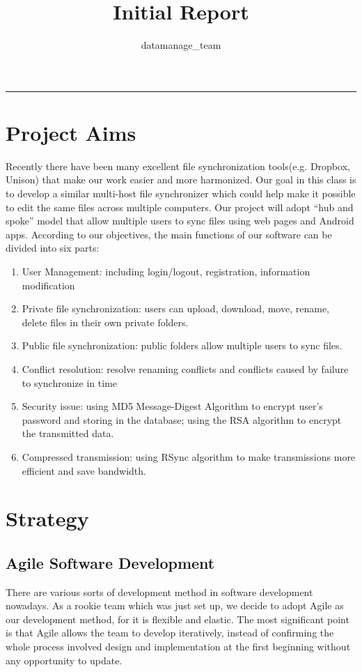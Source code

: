 \documentclass[a4paper,11pt]{article}
\title{Initial Report}
\author{datamanage\_team}
\begin{document}
\maketitle
\begin{center}
\rule{\textwidth}{1pt}
\end{center}

\noindent 
\section{Project Aims}
Recently there have been many excellent file synchronization tools(e.g. Dropbox, Unison) that make our work easier and more harmonized. Our goal in this class is to develop a similar multi-host file synchronizer which could help make it possible to edit the same files across multiple computers. Our project will adopt “hub and spoke” model that allow multiple users to sync files using web pages and Android apps. According to our objectives, the main functions of our software can be divided into six parts:
\begin{enumerate}
\item User Management: including login/logout, registration, information modification
\item Private file synchronization: users can upload, download, move, rename, delete files in their own private folders.
\item  Public file synchronization: public folders allow multiple users to sync files.
\item Conflict resolution: resolve renaming conflicts and conflicts caused by failure to synchronize in time
\item Security issue: using MD5 Message-Digest Algorithm to encrypt user’s password and storing in the database; using the RSA algorithm to encrypt the transmitted data.
\item Compressed transmission: using RSync algorithm to make transmissions more efficient and save bandwidth.
\end{enumerate}
\section{Strategy}
\subsection{Agile Software Development}
There are various sorts of development method in software development nowadays. As a rookie team which was just set up, we decide to adopt Agile as our development method, for it is flexible and elastic. The most significant point is that Agile allows the team to develop iteratively, instead of confirming the whole process involved design and implementation at the first beginning without any opportunity to update.
\end{document}
